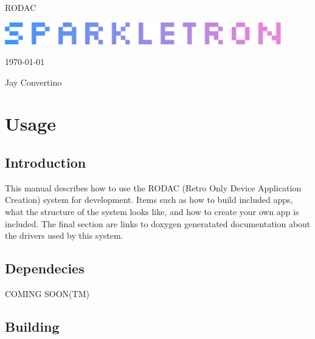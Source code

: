 \documentclass{article}
\begin{document}
  \begin{titlepage}
    \begin{center}

    {\Huge RODAC}

    \vspace{25mm}

    \includegraphics[width=0.90\textwidth,height=\textheight,keepaspectratio]{src/img/SPARKLETRON.png}

    \vspace{25mm}

    \today

    \vspace{15mm}

    {\Large Jay Convertino}

    \end{center}
  \end{titlepage}

  \tableofcontents

  \newpage

  \section{Usage}

  \subsection{Introduction}

  \par
  This manual describes how to use the RODAC (Retro Only Device Application Creation) system for development.
  Items such as how to build included apps, what the structure of the system looks like, and how to create your
  own app is included. The final section are links to doxygen generatated documentation about the drivers used
  by this system.

  \subsection{Dependecies}

  \par
  COMING SOON(TM)

  \subsection{Building}
\end{document}
